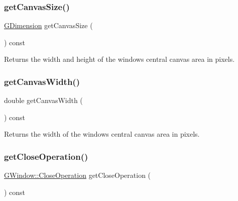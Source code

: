 \subsubsection{\texorpdfstring{get\+Canvas\+Size()}{getCanvasSize()}}
{\footnotesize\ttfamily \mbox{\hyperlink{classGDimension}{G\+Dimension}} get\+Canvas\+Size (\begin{DoxyParamCaption}{ }\end{DoxyParamCaption}) const\hspace{0.3cm}{\ttfamily [virtual]}}



Returns the width and height of the window\textquotesingle{}s central canvas area in pixels. 

\mbox{\label{classGWindow_a82ed6884fd4b0257a825e786236c2428}} 
\subsubsection{\texorpdfstring{get\+Canvas\+Width()}{getCanvasWidth()}}
{\footnotesize\ttfamily double get\+Canvas\+Width (\begin{DoxyParamCaption}{ }\end{DoxyParamCaption}) const\hspace{0.3cm}{\ttfamily [virtual]}}



Returns the width of the window\textquotesingle{}s central canvas area in pixels. 

\mbox{\label{classGWindow_a733b18ceeceb7ab98da8c4ac9a8d2857}} 
\subsubsection{\texorpdfstring{get\+Close\+Operation()}{getCloseOperation()}}
{\footnotesize\ttfamily \mbox{\hyperlink{classGWindow_a84803201f0f9569db61f51cac9e0d2d2}{G\+Window\+::\+Close\+Operation}} get\+Close\+Operation (\begin{DoxyParamCaption}{ }\end{DoxyParamCaption}) const\hspace{0.3cm}{\ttfamily [virtual]}}



